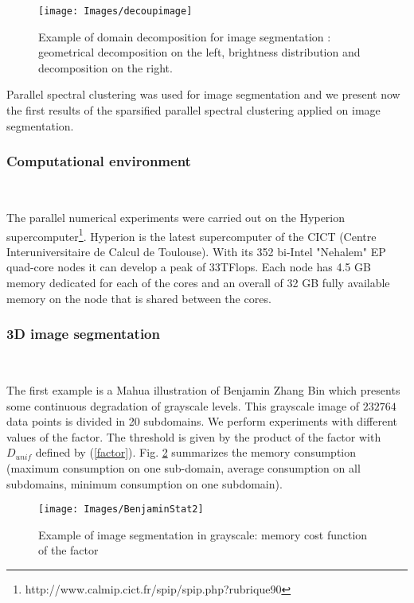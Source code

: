 \documentclass{llncs}
\begin{document}
\begin{figure}[!h]
  \begin{center}
  {\texttt{[image: Images/decoupimage]}}
  \end{center}
  \caption{Example of domain decomposition for image segmentation : geometrical decomposition on the left, brightness distribution and decomposition on the right.}
  \label{ExampleImage}
 \end{figure}


Parallel spectral clustering was used for image segmentation \cite{mouysset3}
and we present now the first results of the sparsified parallel spectral
clustering applied on image segmentation.

\subsubsection{Computational environment}

\

The parallel numerical experiments were carried out on the Hyperion
supercomputer\footnote{http://www.calmip.cict.fr/spip/spip.php?rubrique90}.
Hyperion is the latest supercomputer of the CICT (Centre Interuniversitaire de
Calcul de Toulouse). With its 352 bi-Intel "Nehalem" EP quad-core nodes it can
develop a peak of 33TFlops. Each node has 4.5 GB memory dedicated for each of
the cores and an overall of 32 GB fully available memory on the node that is
shared between the cores.

\subsubsection{3D image segmentation}

\

The first example is a Mahua illustration of Benjamin Zhang Bin which presents some continuous degradation of grayscale levels.
This grayscale image of $232764$ data points is divided in 20 subdomains.
We perform experiments with different values of the factor. The threshold is given by the product of the factor with $D_{unif}$  defined by (\ref{factor}).
Fig. \ref{statBenji} summarizes the memory consumption
(maximum consumption on one sub-domain, average consumption on all subdomains,
minimum consumption on one subdomain).

\begin{figure}[!h]
  \begin{center}
  {\texttt{[image: Images/BenjaminStat2]}}
  \end{center}
  \caption{Example of image segmentation in grayscale: memory cost function of the factor}
  \label{statBenji}
 \end{figure}
\end{document}
